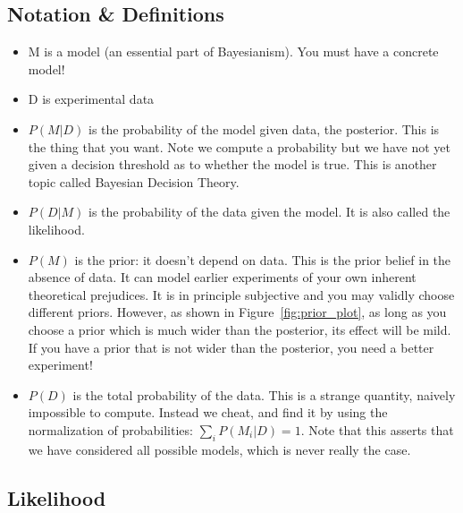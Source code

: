 \documentclass[12pt]{article}
\begin{document}
\subsection{Notation \& Definitions}
\begin{itemize}
  \item M is a model (an essential part of Bayesianism). You must have a concrete model!
  \item D is experimental data
    \item $P(M|D)$ is the probability of the model given data, the posterior. This is the thing that you want. Note we compute a probability but we have not yet given a decision threshold as to whether the model is true. This is another topic called Bayesian Decision Theory.
    \item $P(D|M)$ is the probability of the data given the model. It is also called the likelihood.
    \item $P(M)$ is the prior: it doesn't depend on data. This is the prior belief in the absence of data. It can model earlier experiments of your own inherent theoretical prejudices. It is in principle subjective and you may validly choose different priors. However, as shown in Figure~\ref{fig:prior_plot}, as long as you choose a prior which is much wider than the posterior, its effect will be mild. If you have a prior that is not wider than the posterior, you need a better experiment!
    \item $P(D)$ is the total probability of the data. This is a strange quantity, naively impossible to compute. Instead we cheat, and find it by using the normalization of probabilities: $\sum_i P(M_i|D)=1$. Note that this asserts that we have considered all possible models, which is never really the case.
\end{itemize}

\subsection{Likelihood}
\end{document}
